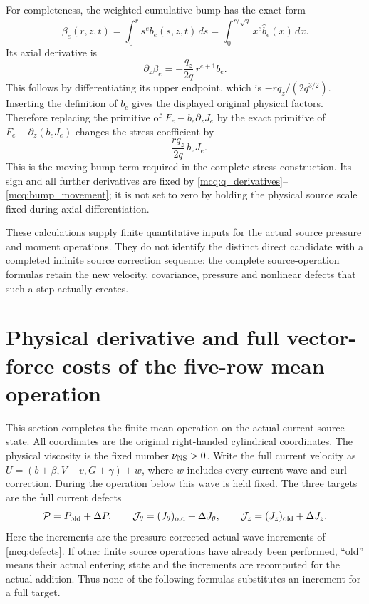 \documentclass[11pt]{article}
\begin{document}
For completeness, the weighted cumulative bump has the exact form
\[
 \beta_e(r,z,t)=\int_0^rs^eb_e(s,z,t)\,ds
              =\int_0^{r/\sqrt q}x^e\widehat b_e(x)\,dx .
\]
Its axial derivative is
\begin{equation}\label{mcq:bump_movement}
 \partial_z\beta_e
 =-\frac{q_z}{2q}\,r^{e+1}b_e .
\end{equation}
This follows by differentiating its upper endpoint, which is
\(-rq_z/(2q^{3/2})\). Inserting the definition of \(b_e\) gives
the displayed original physical factors. Therefore replacing the
primitive of \(F_e-b_e\partial_zJ_e\) by the exact primitive of
\(F_e-\partial_z(b_eJ_e)\) changes the stress coefficient by
\[
 -\frac{rq_z}{2q}\,b_eJ_e .
\]
This is the moving-bump term required in the complete stress construction.
Its sign and all further derivatives are fixed by
\eqref{mcq:q_derivatives}--\eqref{mcq:bump_movement}; it is not set to zero
by holding the physical source scale fixed during axial differentiation.

These calculations supply finite quantitative inputs for the actual
source pressure and moment operations. They do not identify the
distinct direct candidate with a completed infinite source correction
sequence: the complete source-operation formulas retain the new
velocity, covariance, pressure and nonlinear defects that such a step
actually creates.


\section{Physical derivative and full vector-force costs of the five-row mean operation}
\label{mcmean:section}

This section completes the finite mean operation on the actual current
source state. All coordinates are the original right-handed cylindrical
coordinates. The physical viscosity is the fixed number
\(\nu_{\rm NS}>0\). Write the full current velocity as
\(U=(b+\beta,V+v,G+\gamma)+w\), where \(w\) includes every current
wave and curl correction. During the operation below this wave is held
fixed. The three targets are the full current defects
\begin{equation}\label{mcmean:full_targets}
 \mathcal P=P_{\rm old}+\Delta P,\qquad
 \mathcal J_\theta=(J_\theta)_{\rm old}+\Delta J_\theta,\qquad
 \mathcal J_z=(J_z)_{\rm old}+\Delta J_z.
\end{equation}
Here the increments are the pressure-corrected actual wave increments
of \eqref{mcq:defects}. If other finite source operations have already
been performed, ``old'' means their actual entering state and the
increments are recomputed for the actual addition. Thus none of the
following formulas substitutes an increment for a full target.
\end{document}
